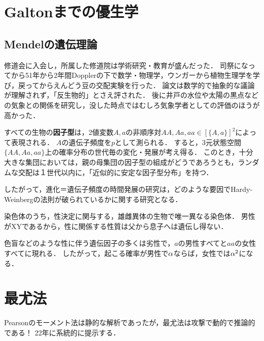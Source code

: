 \documentclass[uplatex,dvipdfmx]{jsreport}
\begin{document}
\section{Galtonまでの優生学}

\subsection{Mendelの遺伝理論}

\begin{history}
    修道会に入会し，所属した修道院は学術研究・教育が盛んだった．
    司祭になってから51年から2年間Dopplerの下で数学・物理学，ウンガーから植物生理学を学び，戻ってからえんどう豆の交配実験を行った．
    論文\cite{Mendel66}は数学的で抽象的な議論が理解されず，「反生物的」とさえ評された．
    後に井戸の水位や太陽の黒点などの気象との関係を研究し，没した時点ではむしろ気象学者としての評価のほうが高かった．
\end{history}

\begin{theory}
    すべての生物の\textbf{因子型}は，2値変数$A,a$の非順序対$AA,Aa,aa\in[\{A,a\}]^2$によって表現される．
    $A$の遺伝子頻度を$p$として測られる．
    すると，3元状態空間$\{AA,Aa,aa\}$上の確率分布の世代毎の変化・発展が考え得る．
    このとき，十分大きな集団においては，親の母集団の因子型の組成がどうであろうとも，ランダムな交配は１世代以内に，「近似的に安定な因子型分布」を持つ\cite{Hardy08}．
\end{theory}
\begin{remarks}
    したがって，進化＝遺伝子頻度の時間発展の研究は，どのような要因でHardy-Weinbergの法則が破られているかに関する研究となる．
\end{remarks}

\begin{theory}[性染色体]
    染色体のうち，性決定に関与する，雄雌異体の生物で唯一異なる染色体．
    男性がXYであるから，性に関係する性質は父から息子へは遺伝し得ない．

    色盲などのような性に伴う遺伝因子の多くは劣性で，$a$の男性すべてと$aa$の女性すべてに現れる．
    したがって，起こる確率が男性で$\alpha$ならば，女性では$\alpha^2$になる．
\end{theory}

\section{最尤法}

\begin{tcolorbox}[colframe=ForestGreen, colback=ForestGreen!10!white,breakable,colbacktitle=ForestGreen!40!white,coltitle=black,fonttitle=\bfseries\sffamily,
title=]
    Pearsonのモーメント法は静的な解析であったが，最尤法は攻撃で動的で推論的である！
    22年\cite{Fisher22}に系統的に提示する．
\end{tcolorbox}
\end{document}
